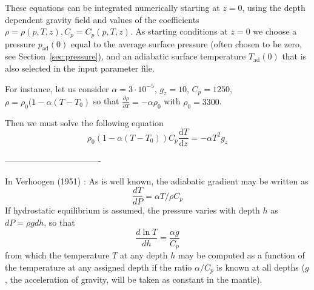 These equations can be integrated numerically starting at $z=0$, using
the depth dependent gravity field and values of the coefficients
$\rho=\rho(p,T,z), C_p=C_p(p,T,z)$. As starting conditions at $z=0$ we
choose a pressure $p_{\textrm{ad}}(0)$ equal to the average surface
pressure (often chosen to be zero, see Section~\ref{sec:pressure}),
and an adiabatic surface temperature $T_{\textrm{ad}}(0)$ that is
also selected in the input parameter file.


For instance, let us consider $\alpha=3\cdot 10^{-5}$, 
$g_z=10$, $C_p=1250$, $\rho=\rho_0(1-\alpha (T-T_0)$ so that 
$\frac{\partial\rho}{\partial T} = -\alpha \rho_0$ 
with $\rho_0=3300$.

Then we must solve the following equation
\[
\rho_0(1-\alpha(T-T_0)) C_p \frac{\textrm{d}T}{\textrm{d}z} 
=
- \alpha T^2  g_z
\]

----------------------------------

In Verhoogen (1951) \cite{verh51}:
As is well known, the adiabatic gradient may be written as
\[
\frac{dT}{dP} = \alpha T /\rho C_p
\]
If hydrostatic equilibrium is assumed, the pressure varies with depth $h$ as 
$dP = \rho g dh$, so that
\[
\frac{d \ln T}{dh} = \frac{\alpha g}{C_p}
\]
from which the temperature $T$ at any depth $h$ may be computed as a function of the temperature
at any assigned depth if the ratio $\alpha/C_p$ 
is known at all depths ($g$, the acceleration of gravity, will
be taken as constant in the mantle).

